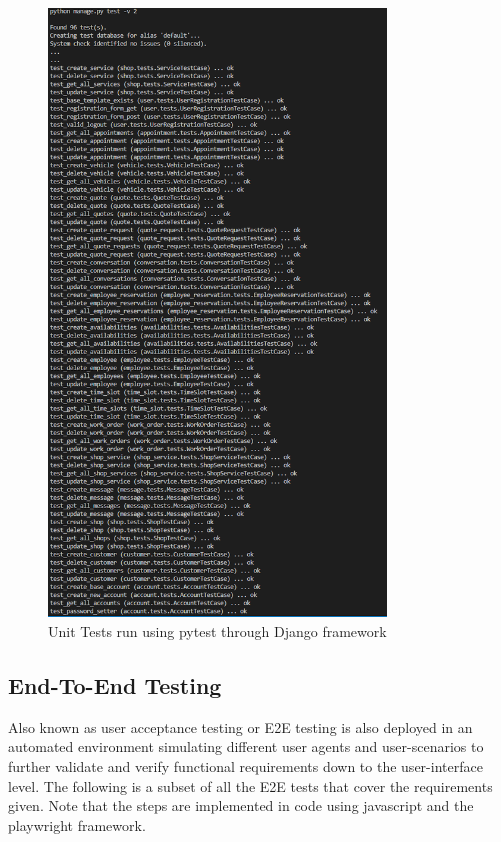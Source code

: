 \documentclass[12pt, titlepage]{article}
\begin{document}
\begin{figure}[H]
    \centering
    \includegraphics[width=0.80\textwidth]{VnVReport/result_images/unit-tests.png}
    \caption{Unit Tests run using pytest through Django framework}
    \label{fig:unit-testing}
\end{figure}

\subsection{End-To-End Testing}

Also known as user acceptance testing or E2E testing is also deployed in an automated environment simulating different user agents and user-scenarios to further validate and verify functional requirements down to the user-interface level. The following is a subset of all the E2E tests that cover the requirements given. Note that the steps are implemented in code using javascript and the playwright framework.
\end{document}
